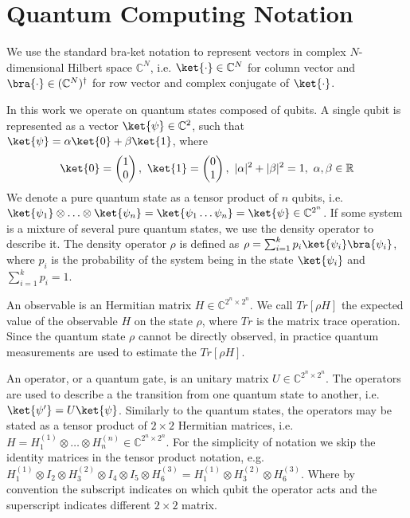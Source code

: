 \chapter{Quantum Computing Notation}\label{chapter:quantum_mechanic_introduction}
We use the standard bra-ket notation to represent vectors in complex
$N$-dimensional Hilbert space $\mathbb{C}^N$, i.e.
$\ket{\cdot} \in \mathbb{C}^N$ for column vector and $\bra{\cdot} \in
(\mathbb{C}^{N})^{\dagger}$ for row vector and complex conjugate of
$\ket{\cdot}$.

In this work we operate on quantum states composed of qubits. A single qubit is
represented as a vector $\ket{\psi} \in \mathbb{C}^2$, such that $\ket{\psi} =
\alpha\ket{0} + \beta\ket{1}$, where 
\begin{align*}
  \ket{0} = \begin{pmatrix}
    1 \\
    0 
  \end{pmatrix},\ 
  \ket{1} = \begin{pmatrix}
    0 \\
    1 
  \end{pmatrix},\ 
  |\alpha|^2 + |\beta|^2 = 1,\
  \alpha, \beta \in \mathbb{R}
\end{align*}
We denote a pure quantum state as a tensor product of $n$ qubits, i.e.
$\ket{\psi_1} \otimes \ldots \otimes \ket{\psi_n} = \ket{\psi_1 \ldots \psi_n} =
\ket{\psi} \in
\mathbb{C}^{2^n}$. 
If some system is a mixture of several pure quantum states, we use the density
operator to describe it. The density operator $\rho$ is defined as $\rho =
\sum_{i=1}^{k}p_i\ket{\psi_i}\bra{\psi_i}$, where $p_i$ is the probability of the
system being in the state $\ket{\psi_i}$ and $\sum_{i=1}^kp_i = 1$.

An observable is an Hermitian matrix $H \in \mathbb{C}^{2^n \times 2^n}$. We
call $Tr[\rho H]$ the expected value of the observable $H$ on the state $\rho$, where
$Tr$ is the matrix trace operation. Since the quantum state $\rho$ cannot be directly
observed, in practice quantum measurements \cite{10.5555/1972505} are used to
estimate the $Tr[\rho H]$.

An operator, or a quantum gate, is an unitary matrix $U \in \mathbb{C}^{2^n
  \times 2^n}$. The operators are used to describe a the transition from one
quantum state to another, i.e. $\ket{\psi'} = U\ket{\psi}$.
Similarly to the quantum states, the operators may be stated as a tensor
product of $2 \times 2$ Hermitian matrices, i.e. $H = H_1^{(1)} \otimes \ldots \otimes
H_n^{(n)} \in \mathbb{C}^{2^n \times 2^n}$. For the simplicity of notation we skip the
identity matrices in the tensor product notation, e.g. $H_1^{(1)} \otimes I_2 \otimes H_3^{(2)}
\otimes I_4 \otimes I_5 \otimes H_6^{(3)} = H_1^{(1)} \otimes H_3^{(2)} \otimes
H_6^{(3)}$. Where by convention the subscript indicates on which qubit the
operator acts and the superscript indicates different $2\times 2$ matrix.

